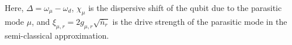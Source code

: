 \documentclass[%
reprint,
superscriptaddress,
 amsmath,amssymb,
 aps,
 prx,
longbibliography,
floatfix,
]{revtex4-2}
\begin{document}
Here, $\Delta=\omega_\mu-\omega_d$, $\chi_\mu$ is the dispersive shift of the qubit due to the parasitic mode $\mu$, and $\xi_{\mu,r}=2g_{\mu,r}\sqrt{\bar n_r}$ is the drive strength of the parasitic mode in the semi-classical approximation. 





\end{document}

